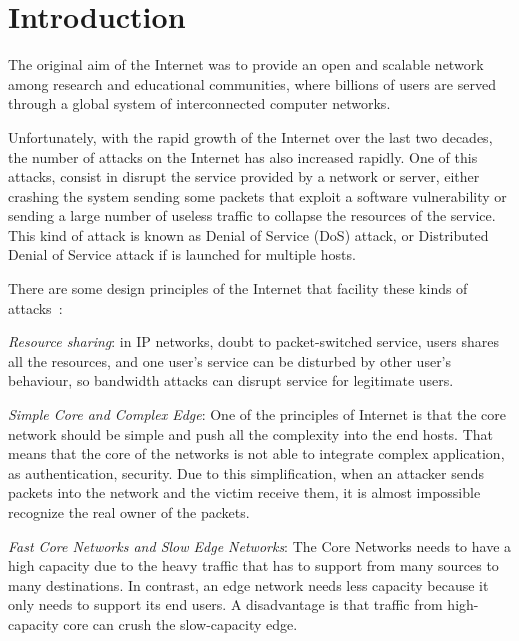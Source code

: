 
\chapter{Introduction}
\label{chapter:intro}

The original aim of the Internet was to provide an open and scalable network among research and educational communities, where billions of users are served through a global system of interconnected computer networks.

\par

Unfortunately, with the rapid growth of the Internet over the last two decades, the number of attacks on the Internet has also increased rapidly. One of this attacks, consist in disrupt the service provided by a network or server, either crashing the system sending some packets that exploit a software vulnerability or sending a large number of useless traffic to collapse the resources of the service. This kind of attack is known as Denial of Service (DoS) attack, or Distributed Denial of Service attack if is launched for multiple hosts.

\par

There are some design principles of the Internet that facility these kinds of attacks~\cite{peng2007survey}:

\par

\textit{Resource sharing}: in IP networks, doubt to packet-switched service, users shares all the resources, and one user's service can be disturbed by other user's behaviour, so bandwidth attacks can disrupt service for legitimate users.
\par
\textit{Simple Core and Complex Edge}: One of the principles of Internet is that the core network should be simple and push all the complexity into the end hosts. That means that the core of the networks is not able to integrate complex application, as authentication, security. Due to this simplification, when an attacker sends packets into the network and the victim receive them, it is almost impossible recognize the real owner of the packets.
\par
\textit{Fast Core Networks and Slow Edge Networks}: The Core Networks needs to have a high capacity due to the heavy traffic that has to support from many sources to many destinations. In contrast, an edge network needs less capacity because it only needs to support its end users. A disadvantage is that traffic from high-capacity core can crush the slow-capacity edge.

